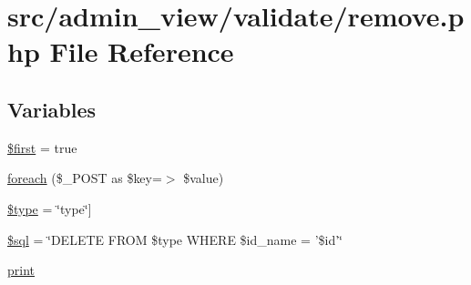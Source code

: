 \hypertarget{remove_8php}{\section{src/admin\-\_\-view/validate/remove.php \-File \-Reference}
\label{remove_8php}
}
\subsection*{\-Variables}
\begin{DoxyCompactItemize}
\item 
\hyperlink{remove_8php_ae73c37b326d9d2b977b30454ad893dd6}{\$first} = true
\item 
\hyperlink{remove_8php_ac6aafbc4d90cd74f481282f505f6c628}{foreach} (\$\-\_\-\-P\-O\-S\-T as \$key=$>$ \$value)
\item 
\hyperlink{remove_8php_a9a4a6fba2208984cabb3afacadf33919}{\$type} = \char`\"{}type\char`\"{}\mbox{]}
\item 
\hyperlink{remove_8php_a047170d6020a882807665812a27e2525}{\$sql} = \char`\"{}\-D\-E\-L\-E\-T\-E \-F\-R\-O\-M \$type \-W\-H\-E\-R\-E \$id\-\_\-name = '\$id'\char`\"{}
\item 
\hyperlink{remove_8php_a3ad3a4240c0f97c7e85aff5c52a454d4}{print}
\end{DoxyCompactItemize}



